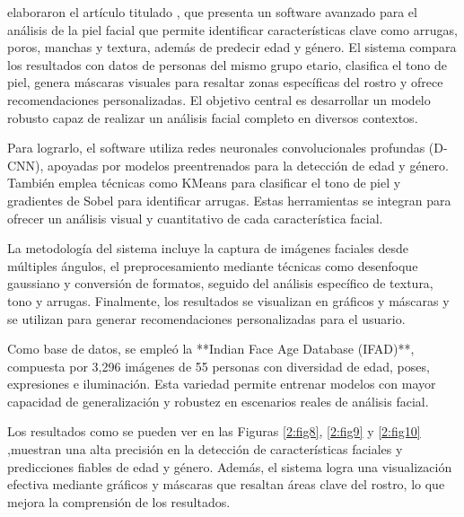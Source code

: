 
\cite{Tamilkodi2024} elaboraron el artículo titulado , que presenta un software avanzado para el análisis de la piel facial que permite identificar características clave como arrugas, poros, manchas y textura, además de predecir edad y género. El sistema compara los resultados con datos de personas del mismo grupo etario, clasifica el tono de piel, genera máscaras visuales para resaltar zonas específicas del rostro y ofrece recomendaciones personalizadas. El objetivo central es desarrollar un modelo robusto capaz de realizar un análisis facial completo en diversos contextos.  

Para lograrlo, el software utiliza redes neuronales convolucionales profundas (D-CNN), apoyadas por modelos preentrenados para la detección de edad y género. También emplea técnicas como KMeans para clasificar el tono de piel y gradientes de Sobel para identificar arrugas. Estas herramientas se integran para ofrecer un análisis visual y cuantitativo de cada característica facial.  

La metodología del sistema incluye la captura de imágenes faciales desde múltiples ángulos, el preprocesamiento mediante técnicas como desenfoque gaussiano y conversión de formatos, seguido del análisis específico de textura, tono y arrugas. Finalmente, los resultados se visualizan en gráficos y máscaras y se utilizan para generar recomendaciones personalizadas para el usuario.  

Como base de datos, se empleó la **Indian Face Age Database (IFAD)**, compuesta por 3,296 imágenes de 55 personas con diversidad de edad, poses, expresiones e iluminación. Esta variedad permite entrenar modelos con mayor capacidad de generalización y robustez en escenarios reales de análisis facial.  

Los resultados como se pueden ver en las Figuras \ref{2:fig8}, \ref{2:fig9} y \ref{2:fig10} ,muestran una alta precisión en la detección de características faciales y predicciones fiables de edad y género. Además, el sistema logra una visualización efectiva mediante gráficos y máscaras que resaltan áreas clave del rostro, lo que mejora la comprensión de los resultados.  

